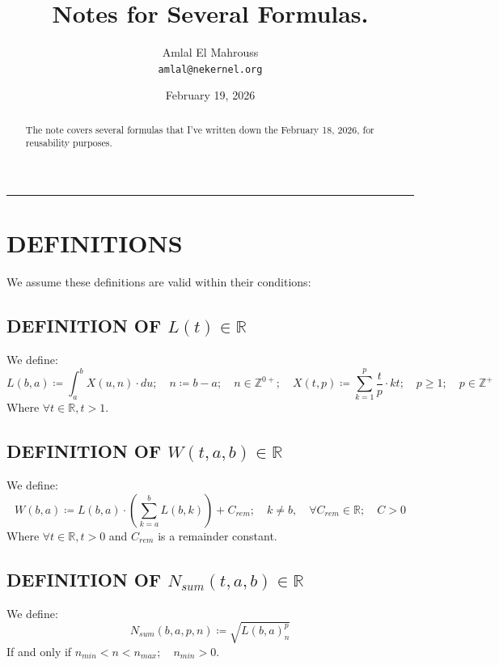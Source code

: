 \documentclass[11pt, a4paper]{article}
\title{Notes for Several Formulas.}
\author{Amlal El Mahrouss\\\texttt{amlal@nekernel.org}}
\date{February 19, 2026}
\begin{document}
\maketitle

\begin{center}
	\rule[0.01cm]{17cm}{0.01cm}
\end{center}

\begin{abstract}
\begin{center}
    The note covers several formulas that I've written down the February 18, 2026, for reusability purposes.
\end{center}
\end{abstract}

\section{DEFINITIONS}

We assume these definitions are valid within their conditions:

\subsection{DEFINITION OF $L(t) \in \mathbb{R}$}
We define:
\begin{equation}
	L(b, a) \coloneqq \int_{a}^{b}X(u, n)\cdot du; \quad n \coloneqq b - a; \quad n \in \mathbb{Z}^{0+}; \quad X(t, p) \coloneqq \sum_{k=1}^{p}\frac{t}{p}\cdot kt; \quad p \geq 1; \quad p \in \mathbb{Z}^{+}
\end{equation}
Where $\forall t \in \mathbb{R}, t > 1$.

\subsection{DEFINITION OF $W(t, a, b) \in \mathbb{R}$}
We define:
\begin{equation}
    W(b, a) \coloneqq L(b, a)\cdot(\sum_{k=a}^{b} L(b, k)) +C_{rem}; \quad k \neq b,\quad \forall C_{rem} \in \mathbb{R}; \quad C > 0
\end{equation}
Where $\forall t \in \mathbb{R}, t > 0$ and $C_{rem}$ is a remainder constant.

\subsection{DEFINITION OF $N_{sum}(t, a, b) \in \mathbb{R}$}

We define:
\begin{equation}
    N_{sum}(b, a, p, n) \coloneqq \sqrt{L(b, a)^p_{n}}
\end{equation}
If and only if $n_{min} < n < n_{max}; \quad n_{min} > 0$.
\end{document}
